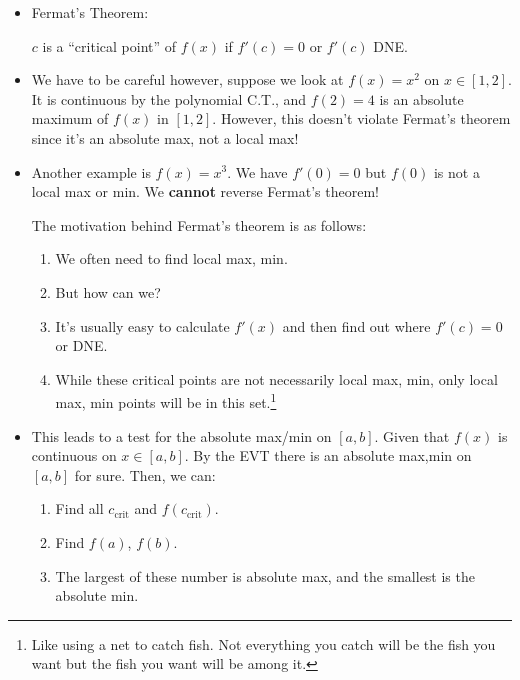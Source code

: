 \begin{itemize}
\begin{theorem}
\begin{proof}
            Since there is a contradiction, there exists at least one $c\in [a,b]$ such that $f(c)=M$. Therefore, a maximum exists.
        \end{proof}
    \end{theorem}
    \item Fermat's Theorem:
    \begin{definition}
        $c$ is a ``critical point'' of $f(x)$ if $f'(c)=0$ or $f'(c)$ DNE.
    \end{definition}
    \item We have to be careful however, suppose we look at $f(x)=x^2$ on $x\in [1,2]$. It is continuous by the polynomial C.T., and $f(2)=4$ is an absolute maximum of $f(x)$ in $[1,2]$. However, this doesn't violate Fermat's theorem since it's an absolute max, not a local max!
    \item Another example is $f(x)=x^3$. We have $f'(0)=0$ but $f(0)$ is not a local max or min. We \textbf{cannot} reverse Fermat's theorem!
    \begin{idea}
        The motivation behind Fermat's theorem is as follows:
        \begin{enumerate}
                \item We often need to find local max, min.
                \item But how can we?
                \item It's usually easy to calculate $f'(x)$ and then find out where $f'(c)=0$ or DNE.
                \item While these critical points are not necessarily local max, min, only local max, min points will be in this set.\footnote{Like using a net to catch fish. Not everything you catch will be the fish you want but the fish you want will be among it.}
        \end{enumerate}
    \end{idea}
    \item This leads to a test for the absolute max/min on $[a,b]$. Given that $f(x)$ is continuous on $x\in [a,b]$. By the EVT there is an absolute max,min on $[a,b]$ for sure. Then, we can:
    \begin{enumerate}
        \item Find all $c_\text{crit}$ and $f(c_\text{crit})$.
        \item Find $f(a)$, $f(b)$.
        \item The largest of these number is absolute max, and the smallest is the absolute min.
    \end{enumerate}

\end{itemize}
